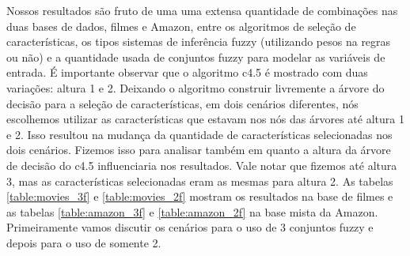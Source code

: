 \documentclass[template.tex]{subfiles}
\begin{document}

Nossos resultados são fruto de uma uma extensa quantidade de combinações nas duas bases de dados, filmes e Amazon, entre os algoritmos de seleção de características, os tipos sistemas de inferência fuzzy (utilizando pesos na regras ou não) e a quantidade usada de conjuntos fuzzy para modelar as variáveis de entrada. É importante observar que o algoritmo c4.5 é mostrado com duas variações: altura 1 e 2. Deixando o algoritmo construir livremente a árvore do decisão para a seleção de características, em dois cenários diferentes, nós escolhemos utilizar as características que estavam nos nós das árvores até altura 1 e 2. Isso resultou na mudança da quantidade de características selecionadas nos dois cenários. Fizemos isso para analisar também em quanto a altura da árvore de decisão do c4.5 influenciaria nos resultados. Vale notar que fizemos até altura 3, mas as características selecionadas eram as mesmas para altura 2. 
As tabelas \ref{table:movies_3f} e \ref{table:movies_2f} mostram os resultados na base de filmes e as tabelas \ref{table:amazon_3f} e \ref{table:amazon_2f} na base mista da Amazon. Primeiramente vamos discutir os cenários para o uso de 3 conjuntos fuzzy e depois para o uso de somente 2.
\end{document}
